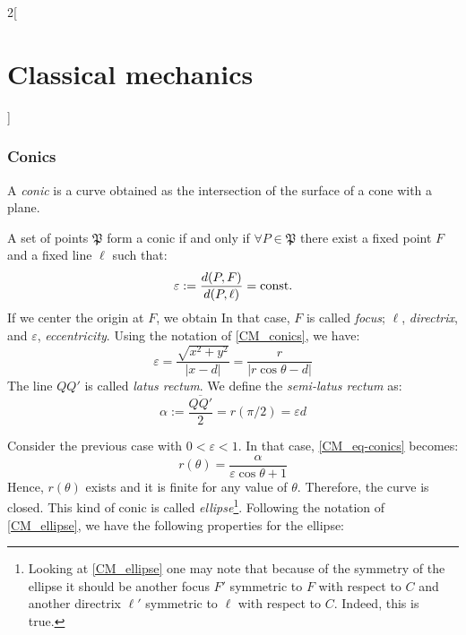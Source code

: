 \documentclass[../../../main_physics.tex]{subfiles}
\begin{document}
\begin{multicols}{2}[\section{Classical mechanics}]
  \subsubsection{Conics}
  \begin{definition}
    A \emph{conic} is a curve obtained as the intersection of the surface of a cone with a plane.
  \end{definition}
  \begin{proposition}
    A set of points $\mathfrak{P}$ form a conic if and only if $\forall P\in\mathfrak{P}$ there exist a fixed point $F$ and a fixed line $\ell$ such that: $$\varepsilon:=\frac{d(P,F)}{d(P,\ell)}=\text{const.}$$ If we center the origin at $F$, we obtain In that case, $F$ is called \emph{focus}; $\ell$, \emph{directrix}, and $\varepsilon$, \emph{eccentricity}. Using the notation of \cref{CM_conics}, we have:
    \begin{equation}\label{CM_eq-conics}
      \varepsilon=\frac{\sqrt{x^2+y^2}}{|x-d|}=\frac{r}{|r\cos\theta -d|}
    \end{equation}
    The line $QQ'$ is called \emph{latus rectum}. We define the \emph{semi-latus rectum} as: $$\alpha:=\frac{\overline{QQ'}}{2}=r(\pi/2)=\varepsilon d$$
    \begin{center}
      \begin{minipage}{\linewidth}
        \centering
        
        \label{CM_conics}
      \end{minipage}
    \end{center}
  \end{proposition}
  \begin{definition}
    Consider the previous case with $0<\varepsilon<1$. In that case, \cref{CM_eq-conics} becomes:
    \begin{equation}\label{CM_eq-ellipse}
      r(\theta)=\frac{\alpha}{\varepsilon\cos\theta+1}
    \end{equation}
    Hence, $r(\theta)$ exists and it is finite for any value of $\theta$. Therefore, the curve is closed. This kind of conic is called \emph{ellipse}\footnote{Looking at \cref{CM_ellipse} one may note that because of the symmetry of the ellipse it should be another focus $F'$ symmetric to $F$ with respect to $C$ and another directrix $\ell'$ symmetric to $\ell$ with respect to $C$. Indeed, this is true.}.
    Following the notation of \cref{CM_ellipse}, we have the following properties for the ellipse:

\end{definition}
\end{multicols}
\end{document}
